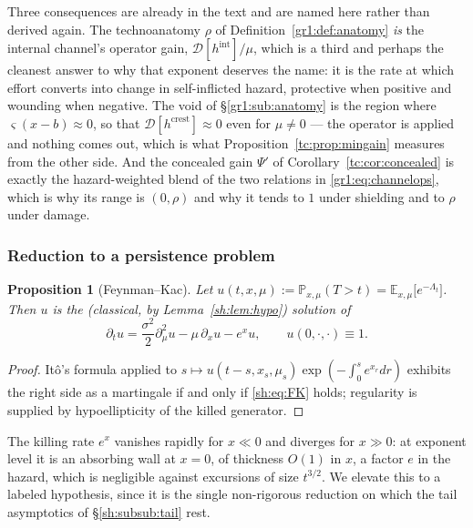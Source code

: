 \documentclass[11pt]{article}
\numberwithin{equation}{section}
\theoremstyle{plain}
\newtheorem{proposition}[theorem]{Proposition}
\theoremstyle{definition}
\theoremstyle{remark}
\newcommand{\E}{\mathbb{E}}
\newcommand{\PP}{\mathbb{P}}
\begin{document}
Three consequences are already in the text and are named here rather
than derived again. The technoanatomy $\rho$ of
Definition~\ref{gr1:def:anatomy} \emph{is} the internal channel's
operator gain, $\mathcal D[h^{\mathrm{int}}]/\mu$, which is a third and
perhaps the cleanest answer to why that exponent deserves the name: it
is the rate at which effort converts into change in self-inflicted
hazard, protective when positive and wounding when negative. The void
of \S\ref{gr1:sub:anatomy} is the region where $\varsigma(x-b)\approx0$,
so that $\mathcal D[h^{\mathrm{crest}}]\approx0$ even for $\mu\neq0$ ---
the operator is applied and nothing comes out, which is what
Proposition~\ref{tc:prop:mingain} measures from the other side. And the
concealed gain $\Psi'$ of Corollary~\ref{tc:cor:concealed} is exactly
the hazard-weighted blend of the two relations in
\eqref{gr1:eq:channelops}, which is why its range is $(0,\rho)$ and why
it tends to $1$ under shielding and to $\rho$ under damage.

\subsubsection{Reduction to a persistence problem}\label{sh:subsub:reduction}

\begin{proposition}[Feynman--Kac]\label{sh:prop:FK}
Let $u(t,x,\mu):=\PP_{x,\mu}(T>t)=\E_{x,\mu}\bigl[e^{-\Lambda_t}\bigr]$.
Then $u$ is the (classical, by Lemma~\ref{sh:lem:hypo}) solution of
\begin{equation}\label{sh:eq:FK}
\partial_tu=\frac{\sigma^2}{2}\partial_\mu^2u-\mu\,\partial_xu-e^{x}u,
\qquad u(0,\cdot,\cdot)\equiv1 .
\end{equation}
\end{proposition}

\begin{proof}
It\^o's formula applied to $s\mapsto
u(t-s,x_s,\mu_s)\exp(-\int_0^se^{x_r}dr)$ exhibits the right side as a
martingale if and only if \eqref{sh:eq:FK} holds; regularity is supplied by
hypoellipticity of the killed generator.
\end{proof}

The killing rate $e^x$ vanishes rapidly for $x\ll0$ and diverges for
$x\gg0$: at exponent level it is an absorbing wall at $x=0$, of thickness
$O(1)$ in $x$, a factor $e$ in the hazard, which is negligible against
excursions of size $t^{3/2}$. We elevate this to a labeled hypothesis, since
it is the single non-rigorous reduction on which the tail asymptotics of
\S\ref{sh:subsub:tail} rest.
\end{document}
